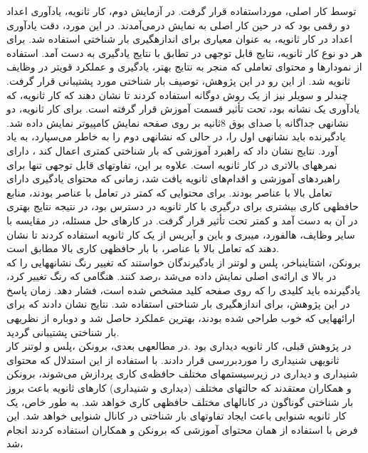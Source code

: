 توسط كار اصلی، مورداستفاده قرار گرفت. در آزمایش دوم، كار ثانویه، یادآوری اعداد دو رقمی بود كه در 
حين كار اصلی به نمایش درمی‌آمدند. در این مورد، دقت یادآوری اعداد در كار ثانویه، به عنوان معياری
برای اندازهگيری بار شناختی استفاده شد. برای هر دو نوع كار ثانویه، نتایج قابل توجهی در تطابق با نتایج
یادگيری به دست آمد. استفاده از نمودارها و محتوای تعاملی كه منجر به نتایج بهتر، یادگيری و عملکرد
قویتر در وظایف ثانویه شد. از این رو در این پژوهش، توصيف بار شناختی مورد پشتيبانی قرار گرفت.
\cite{marcus1996understanding}
چندلر و سویلر نيز از یک روش دوگانه استفاده كردند تا نشان دهند كه كار ثانویه، كه یادآوری یک نشانه
بود، تحت تأثير قسمت آموزش قرار گرفته است. برای كار ثانویه، دو نشانهی جداگانه با صدای بوق  8ثانيه
بر روی صفحه نمایش كامپيوتر نمایش داده شد. یادگيرنده باید نشانهی اول را، در حالی كه نشانهی دوم را 
به خاطر می‌سپارد، به یاد آورد. نتایج نشان داد كه راهبرد آموزشی كه بار شناختی كمتری اعمال كند ،
دارای نمرههای بالاتری در كار ثانویه است. علاوه بر این، تفاوتهای قابل توجهی تنها برای راهبردهای
آموزشی و اقدام‌‌های ثانویه یافت شد، زمانی كه محتوای یادگيری دارای تعامل بالا با عناصر بودند. برای
محتوایی كه كمتر در تعامل با عناصر بودند، منابع حافظهی كاری بيشتری برای درگيری با كار ثانویه در 
دسترس بود، در نتيجه نتایج بهتری در آن به دست آمد و كمتر تحت تأثير قرار گرفت.
\cite{chandler1996cognitive}
در كارهای حل 
مسئله، در مقایسه با سایر وظایف، هالفورد، ميبری و باین
\cite{halford1986capacity}
و آیریس
\cite{ayres2001systematic}
از یک كار ثانویه استفاده
كردند تا نشان دهند كه تعامل بالا با عناصر، با بار حافظهی كاری بالا مطابق است.
\\
برونکن، اشتاینباخر، پلس و لوتنر از یادگيرندگان خواستند كه تغيير رنگ نشانههایی را كه در بالا ی
ارائه‌ی اصلی نمایش داده می‌شد ،رصد كنند. هنگامی كه رنگ تغيير كرد، یادگيرنده باید كليدی را كه روی
صفحه كليد مشخص شده است، فشار دهد. زمان پاسخ در این پژوهش، برای اندازهگيری بار شناختی استفاده شد. نتایج نشان دادند كه برای ارائههایی كه خوب طراحی شده بودند، بهترین عملکرد حاصل شد 
و دوباره از نظریهی بار شناختی پشتيبانی گردید.
\cite{brunken2004assessment}
\\
در پژوهش قبلی، كار ثانویه دیداری بود .در مطالعهی بعدی، برونکن ،پلس و لوتنر كار ثانویهی شنيداری
را موردبررسی قرار دادند. با استفاده از این استدلال كه محتوای شنيداری و دیداری در زیرسيستمهای
مختلف حافظه‌ی كاری پردازش می‌شوند، برونکن و همکاران معتقدند كه حالتهای مختلف (دیداری و 
شنيداری) كارهای ثانویه باعث بروز بار شناختی گوناگون در كانالهای مختلف حافظهی كاری خواهد شد.
به طور  خاص،  یک كار  ثانویه شنوایی باعث ایجاد تفاوتهای بار  شناختی در  كانال  شنوایی خواهد 
شد.
\cite{brunken2004assessment}
این فرض با استفاده از همان محتوای آموزشی كه برونکن و همکاران استفاده كردند انجام شد، 
